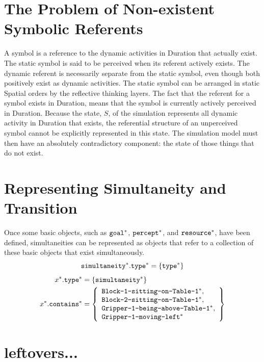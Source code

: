 \section{The Problem of Non-existent Symbolic Referents}

A symbol is a reference to the dynamic activities in Duration that
actually exist.  The static symbol is said to be perceived when its
referent actively exists.  The dynamic referent is necessarily
separate from the static symbol, even though both positively exist as
dynamic activities.  The static symbol can be arranged in static
Spatial orders by the reflective thinking layers.  The fact that the
referent for a symbol exists in Duration, means that the symbol is
currently actively perceived in Duration.  Because the state, $S$, of
the simulation represents all dynamic activity in Duration that
exists, the referential structure of an unperceived symbol cannot be
explicitly represented in this state.  The simulation model must then
have an absolutely contradictory component: the state of those things
that do not exist.

\section{Representing Simultaneity and Transition}

Once some basic objects, such as $\text{\tt{goal}}^*$,
$\text{\tt{percept}}^*$, and $\text{\tt{resource}}^*$, have been
defined, simultaneities can be represented as objects that refer to a
collection of these basic objects that exist simultaneously.
\begin{equation}
\text{\tt{simultaneity}}^*.\text{\tt{type}}^* = \{\text{\tt{type}}^*\} \\
\end{equation}
\begin{align}
    x^*.\text{\tt{type}}^* &= \{\text{\tt{simultaneity}}^*\} \\
x^*.\text{\tt{contains}}^* &=
  \left\{
    \begin{array}{l}
      \text{\tt{Block-1-sitting-on-Table-1}}^*, \\
      \text{\tt{Block-2-sitting-on-Table-1}}^*, \\
      \text{\tt{Gripper-1-being-above-Table-1}}^*, \\
      \text{\tt{Gripper-1-moving-left}}^*
    \end{array}
  \right\}
\end{align}


\section{leftovers...}

